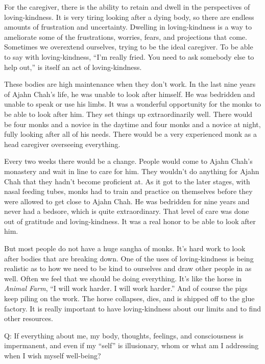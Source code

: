 For the caregiver, there is the ability to retain and dwell in the
perspectives of loving-kindness. It is very tiring looking after a dying
body, so there are endless amounts of frustration and uncertainty.
Dwelling in loving-kindness is a way to ameliorate some of the
frustrations, worries, fears, and projections that come. Sometimes we
overextend ourselves, trying to be the ideal caregiver. To be able to
say with loving-kindness, “I’m really fried. You need to ask somebody
else to help out,” is itself an act of loving-kindness.

These bodies are high maintenance when they don’t work. In the last nine
years of Ajahn Chah’s life, he was unable to look after himself. He was
bedridden and unable to speak or use his limbs. It was a wonderful
opportunity for the monks to be able to look after him. They set things
up extraordinarily well. There would be four monks and a novice in the
daytime and four monks and a novice at night, fully looking after all of
his needs. There would be a very experienced monk as a head caregiver
overseeing everything.

Every two weeks there would be a change. People would come to Ajahn
Chah’s monastery and wait in line to care for him. They wouldn’t do
anything for Ajahn Chah that they hadn’t become proficient at. As it got
to the later stages, with nasal feeding tubes, monks had to train and
practice on themselves before they were allowed to get close to Ajahn
Chah. He was bedridden for nine years and never had a bedsore, which is
quite extraordinary. That level of care was done out of gratitude and
loving-kindness. It was a real honor to be able to look after him.

But most people do not have a huge sangha of monks. It’s hard work to
look after bodies that are breaking down. One of the uses of
loving-kindness is being realistic as to how we need to be kind to
ourselves and draw other people in as well. Often we feel that we should
be doing everything. It’s like the horse in \emph{Animal Farm}, “I will
work harder. I will work harder.” And of course the pigs keep piling on
the work. The horse collapses, dies, and is shipped off to the glue
factory. It is really important to have loving-kindness about our limits
and to find other resources.

\qaspace
Q: If everything about me, my body, thoughts, feelings, and
consciousness is impermanent, and even if my “self” is illusionary, whom
or what am I addressing when I wish myself well-being?

